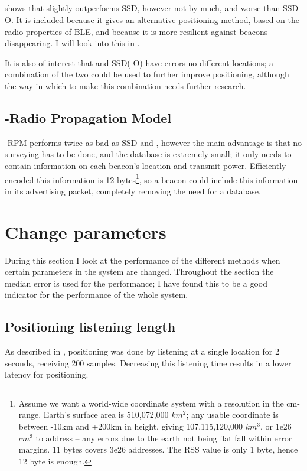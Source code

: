 \subsection{\BRP}
 shows that \aBRP slightly outperforms SSD, however not by much, and worse than SSD-O.
It is included because it gives an alternative positioning method, based on the radio properties of BLE, and because it is more resilient against beacons disappearing.
I will look into this in .

It is also of interest that \aBRP and SSD(-O) have errors no different locations; a combination of the two could be used to further improve positioning, although the way in which to make this combination needs further research.

\subsection{\BRP-Radio Propagation Model}
\aBRP-RPM performs twice as bad as SSD and \aBRP, however the main advantage is that no surveying has to be done, and the database is extremely small; it only needs to contain information on each beacon's location and transmit power.
Efficiently encoded this information is 12 bytes\footnote{
    Assume we want a world-wide coordinate system with a resolution in the cm-range.
    Earth's surface area is 510,072,000 $km^2$; any usable coordinate is between -10km and +200km in height, giving 107,115,120,000 $km^3$, or 1e26 $cm^3$ to address -- any errors due to the earth not being flat fall within error margins.
    11 bytes covers 3e26 addresses.
    The RSS value is only 1 byte, hence 12 byte is enough.
}, so a beacon could include this information in its advertising packet, completely removing the need for a database.



\section{Change parameters}
During this section I look at the performance of the different methods when certain parameters in the system are changed.
Throughout the section the median error is used for the performance; I have found this to be a good indicator for the performance of the whole system.

\subsection{Positioning listening length}
As described in , positioning was done by listening at a single location for 2 seconds, receiving 200 samples.
Decreasing this listening time results in a lower latency for positioning.

